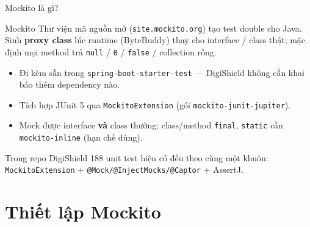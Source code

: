 \documentclass[aspectratio=169,12pt]{beamer}
\begin{document}
\begin{frame}{Mockito là gì?}
  \begin{block}{Mockito \cite{mockito}}
    Thư viện mã nguồn mở (\texttt{site.mockito.org}) tạo test double cho Java.
    Sinh \textbf{proxy class} lúc runtime (ByteBuddy) thay cho interface /
    class thật; mặc định mọi method trả \texttt{null} / \texttt{0} /
    \texttt{false} / collection rỗng.
  \end{block}

  \begin{itemize}
    \item Đi kèm sẵn trong \texttt{spring-boot-starter-test} --- DigiShield
      không cần khai báo thêm dependency nào.
    \item Tích hợp JUnit 5 qua \texttt{MockitoExtension}
      (gói \texttt{mockito-junit-jupiter}).
    \item Mock được interface \textbf{và} class thường; class/method
      \texttt{final}, \texttt{static} cần \texttt{mockito-inline} (hạn chế dùng).
  \end{itemize}

  \begin{exampleblock}{Trong repo DigiShield}
    188 unit test hiện có đều theo cùng một khuôn:
    \texttt{MockitoExtension} + \texttt{@Mock/@InjectMocks/@Captor} + AssertJ.
  \end{exampleblock}
\end{frame}

\section{Thiết lập Mockito}
\end{document}
